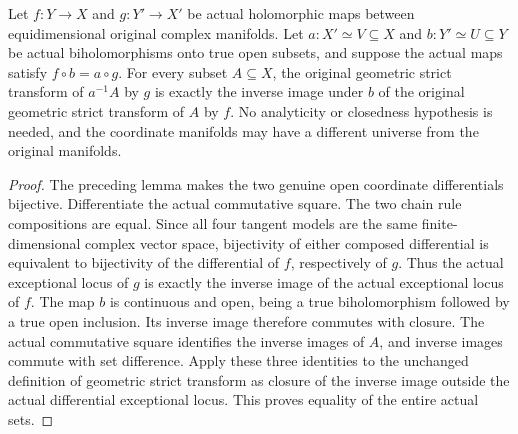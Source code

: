 \begin{theorem}
\label{hir:actual-open-coordinate-geometric-strict-square}
\leanok
Let $f:Y\to X$ and $g:Y'\to X'$ be actual holomorphic maps between
equidimensional original complex manifolds. Let $a:X'\simeq V\subseteq X$
and $b:Y'\simeq U\subseteq Y$ be actual biholomorphisms onto true open
subsets, and suppose the actual maps satisfy $f\circ b=a\circ g$.
For every subset $A\subseteq X$, the original geometric strict transform
of $a^{-1}A$ by $g$ is exactly the inverse image under $b$ of the original
geometric strict transform of $A$ by $f$. No analyticity or closedness
hypothesis is needed, and the coordinate manifolds may have a different
universe from the original manifolds.
\end{theorem}
\begin{proof}
The preceding lemma makes the two genuine open coordinate differentials
bijective. Differentiate the actual commutative square. The two chain
rule compositions are equal. Since all four tangent models are the same
finite-dimensional complex vector space, bijectivity of either composed
differential is equivalent to bijectivity of the differential of $f$,
respectively of $g$. Thus the actual exceptional locus of $g$ is exactly
the inverse image of the actual exceptional locus of $f$.
The map $b$ is continuous and open, being a true biholomorphism followed
by a true open inclusion. Its inverse image therefore commutes with
closure. The actual commutative square identifies the inverse images of
$A$, and inverse images commute with set difference. Apply these three
identities to the unchanged definition of geometric strict transform
as closure of the inverse image outside the actual differential
exceptional locus. This proves equality of the entire actual sets.
\end{proof}

